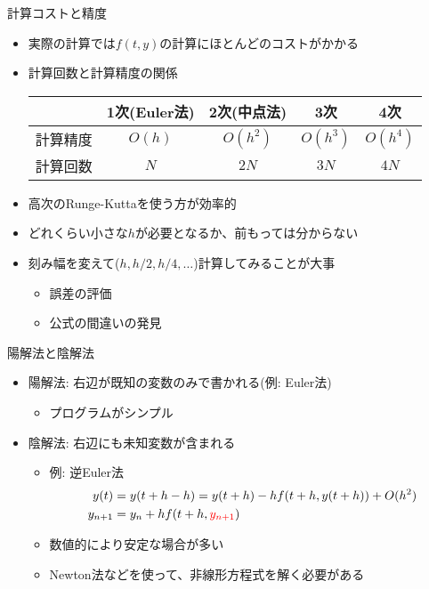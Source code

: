 \begin{frame}[t,fragile]{計算コストと精度}
  \begin{itemize}
    \setlength{\itemsep}{1em}
  \item 実際の計算では$f(t,y)$の計算にほとんどのコストがかかる
  \item 計算回数と計算精度の関係
    \begin{center}
      \begin{tabular}[h]{c|cccc}
        & 1次(Euler法) & 2次(中点法) & 3次 & 4次 \\
        \hline
        計算精度 & $O(h)$ & $O(h^2)$ & $O(h^3)$ & $O(h^4)$ \\
        計算回数 & $N$ & $2N$ & $3N$ & $4N$
      \end{tabular}
    \end{center}
  \item 高次のRunge-Kuttaを使う方が効率的
  \item どれくらい小さな$h$が必要となるか、前もっては分からない
  \item 刻み幅を変えて($h,h/2,h/4,\dots$)計算してみることが大事
    \begin{itemize}
    \item 誤差の評価
    \item 公式の間違いの発見
    \end{itemize}
  \end{itemize}
\end{frame}

\begin{frame}[t,fragile]{陽解法と陰解法}
  \begin{itemize}
    \setlength{\itemsep}{1em}
  \item 陽解法: 右辺が既知の変数のみで書かれる(例: Euler法)
    \begin{itemize}
    \item プログラムがシンプル
    \end{itemize}
  \item 陰解法: 右辺にも未知変数が含まれる
    \begin{itemize}
    \item 例: 逆Euler法
      \begin{align*}
        y(t) &= y(t+h-h) = y(t+h) - h f(t+h,y(t+h)) + O(h^2) \\
        y_{n+1} &= y_n + h f(t+h,{\color{red}y_{n+1}})
      \end{align*}
    \item 数値的により安定な場合が多い
    \item Newton法などを使って、非線形方程式を解く必要がある
    \end{itemize}
  \end{itemize}
\end{frame}
